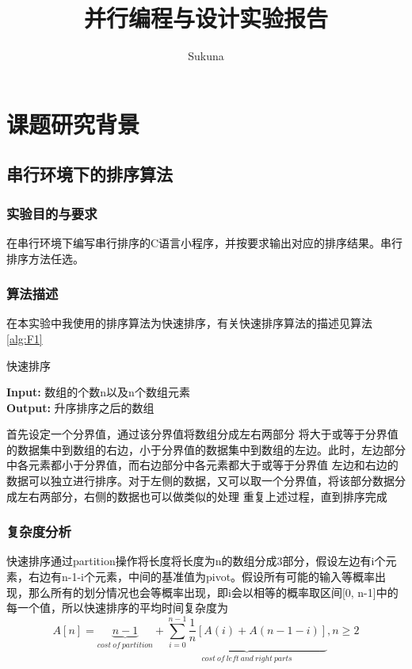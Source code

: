 \documentclass[supercite]{Experimental_Report}
\title{并行编程与设计实验报告}
\author{Sukuna}
\theoremstyle{definition}
\begin{document}
\maketitle
\clearpage


\section{课题研究背景}
\subsection{串行环境下的排序算法}
\subsubsection{实验目的与要求}

在串行环境下编写串行排序的C语言小程序，并按要求输出对应的排序结果。串行排序方法任选。

\subsubsection{算法描述}
在本实验中我使用的排序算法为快速排序，有关快速排序算法的描述见算法\ref{alg:F1}
\begin{algorithm}[htb]
\caption{快速排序}
\label{alg:F1}
\hspace*{0.02in} {\bf Input:}
数组的个数n以及n个数组元素\\
\hspace*{0.02in} {\bf Output:} 
升序排序之后的数组
\begin{algorithmic}[1] 
\State 首先设定一个分界值，通过该分界值将数组分成左右两部分
\State 将大于或等于分界值的数据集中到数组的右边，小于分界值的数据集中到数组的左边。此时，左边部分中各元素都小于分界值，而右边部分中各元素都大于或等于分界值
\State 左边和右边的数据可以独立进行排序。对于左侧的数据，又可以取一个分界值，将该部分数据分成左右两部分，右侧的数据也可以做类似的处理
\State 重复上述过程，直到排序完成
\end{algorithmic}
\end{algorithm}

\subsubsection{复杂度分析}
快速排序通过partition操作将长度将长度为n的数组分成3部分，假设左边有i个元素，右边有n-1-i个元素，中间的基准值为pivot。假设所有可能的输入等概率出现，那么所有的划分情况也会等概率出现，即i会以相等的概率取区间[0, n-1]中的每一个值，所以快速排序的平均时间复杂度为
$$ A[n] = \underbrace{n-1}_{cost \ of \ partition}+\underbrace{\sum_{i = 0}^{n-1}\frac{1}{n}[A(i) + A(n-1-i)]}_{cost \ of \ left \ and \ right \ parts},n \ge 2 $$
\end{document}
